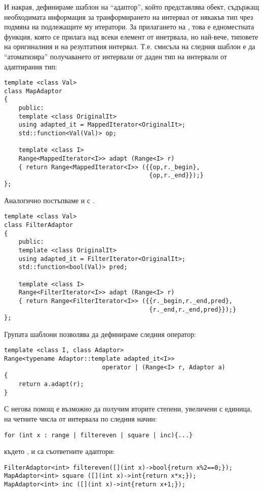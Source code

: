 \begin{mdframed}[hidealllines=true,backgroundcolor=gray!20]
И накрая, дефинираме шаблон на ``адаптор'', който представлява обект, съдържащ необходимата информация за транформирането на интервал от някакъв тип чрез подмяна на подлежащите му итератори. За прилагането на , това е едноместната функция, която се прилага над всеки елемент от инетрвала, но най-вече, типовете на оригиналния и на резултатния интервал. Т.е. смисъла на следния шаблон е да ``атоматизира'' получаването от интервали от даден тип на интервали от адаптирания тип:
\begin{verbatim}
template <class Val>
class MapAdaptor
{
    public:
    template <class OriginalIt>
    using adapted_it = MappedIterator<OriginalIt>;
    std::function<Val(Val)> op;
    
    template <class I>
    Range<MappedIterator<I>> adapt (Range<I> r)
    { return Range<MappedIterator<I>> ({{op,r._begin},
                                        {op,r._end}});}
};
\end{verbatim}

Аналогично постъпваме и с .
\begin{verbatim}
template <class Val>
class FilterAdaptor
{
    public:
    template <class OriginalIt>
    using adapted_it = FilterIterator<OriginalIt>;
    std::function<bool(Val)> pred;

    template <class I>
    Range<FilterIterator<I>> adapt (Range<I> r)
    { return Range<FilterIterator<I>> ({{r._begin,r._end,pred},
                                        {r._end,r._end,pred}});}
};
\end{verbatim}
  
Групата шаблони позволява да дефинираме следния оператор:

\begin{verbatim}
template <class I, class Adaptor>
Range<typename Adaptor::template adapted_it<I>> 
                           operator | (Range<I> r, Adaptor a)
{
    return a.adapt(r);
}
\end{verbatim}

С негова помощ е възможно да получим вторите степени, увеличени с единица, на четните числа от интервала  по следния начин:

\begin{verbatim}
for (int x : range | filtereven | square | inc){...}
\end{verbatim}

където ,  и  са съответните адаптори:
\begin{verbatim}
FilterAdaptor<int> filtereven([](int x)->bool{return x%2==0;});
MapAdaptor<int> square ([](int x)->int{return x*x;});
MapAdaptor<int> inc ([](int x)->int{return x+1;});  
\end{verbatim}
\end{mdframed}

